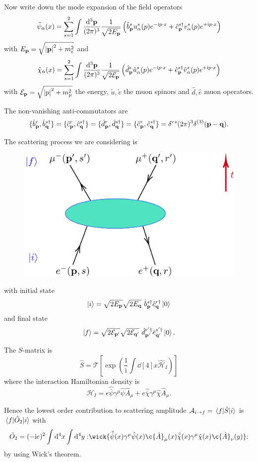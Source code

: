 \documentclass[a4paper,11pt]{article}
\begin{document}
	Now write down the mode expansion of the field operators
	\[
		\hat \psi_\alpha(x) = \sum _{s = 1}^2 \int \frac{\dd[3]{\vb p}}{(2\pi)^{3}} \frac{1}{\sqrt{2 E _{\vb p}}} \left( \hat b^s_{\vb p} u^s_\alpha(p) e ^{- \mathrm{i} p \cdot x} + \hat c^{s\dagger}_{\vb p} v^s_\alpha(p) e ^{+ \mathrm{i} p \cdot x} \right)
	\]
	with $E _{\vb p} = \sqrt{\abs{\vb p}^2 + m_e^2}$ and
	\[
		\hat \chi_\alpha(x) = \sum _{s = 1}^2 \int \frac{\dd[3]{\vb p}}{(2\pi)^{3}} \frac{1}{\sqrt{2 \mathcal{E} _{\vb p}}} \left( \hat d^s_{\vb p} \tilde u^s_\alpha(p) e ^{- \mathrm{i} p \cdot x} + \hat e^{s\dagger}_{\vb p} \tilde v^s_\alpha(p) e ^{+ \mathrm{i} p \cdot x} \right)
	\]
	with $\mathcal{E}_{\vb p} = \sqrt{\abs{p}^2 + m_\mu^2}$ the energy, $\tilde u, \tilde v$ the muon spinors and $\hat d, \hat e$ muon operators.

	The non-vanishing anti-commutators are
	\[
		\{\hat b^r _{\vb p}, \hat b ^{s\dagger}_{\vb q}\} = \{\hat c^r _{\vb p}, \hat c ^{s\dagger}_{\vb q}\} = \{\hat d^r _{\vb p}, \hat d ^{s\dagger}_{\vb q}\} = \{\hat e^r _{\vb p}, \hat e ^{s\dagger}_{\vb q}\} = \delta ^{rs} (2 \pi)^3 \delta ^{(3)}(\vb p - \vb q).
	\]
	
	The scattering process we are considering is 
	
	\begin{figure}[H]
		\centering
		\includegraphics[width=0.5\linewidth]{fig/ee-mumu.pdf}
	\end{figure}
	
	with initial state
	\[
		\ket{i} = \sqrt{2 E _{\vb p}} \sqrt{2 E _{\vb q}}\  \hat b^{s\dagger}_{\vb p} \hat c^{r\dagger}_{\vb q} \ket{0}
	\]
	and final state
	\[
		\ket{f} = \sqrt{2 \mathcal{E}_{\vb p'}} \sqrt{2 \mathcal{E}_{\vb q'}}\ \hat d^{r'\dagger}_{\vb p'} \hat e^{s'\dagger}_{\vb q'} \ket{0}.
	\]
	
	The $S$-matrix is
	\[
		\hat S = \mathcal{T}\left[ \exp(\frac{1}{\mathrm{i}} \int \dd[4]{x} \hat {\mathcal{H}}_I) \right]
	\]
	where the interaction Hamiltonian density is
	\[
		\hat{\mathcal{H}}_I = e \hat{\bar \psi} \gamma^\mu \hat \psi \hat A_\mu + e \hat{\bar \chi} \gamma^\mu \hat \chi \hat A_\mu.
	\]
	
	Hence the lowest order contribution to scattering amplitude $\mathcal{A}_{i \to f} = \mel{f}{\hat S}{i}$ is
	$\mel{f}{\hat O_2}{i}$ with
	\[
		\hat O_2 = (-\mathrm{i} e)^2 \int \dd[4]{x} \int \dd[4]{y} \nord{\wick{\hat{\bar \psi}(x) \gamma^\mu \hat \psi(x) \c{\hat A}_\mu(x) \hat{\bar \chi}(x)\gamma^\mu \hat \chi(x) \c{\hat A}_\nu(y)}}
	\]
	by using Wick's theorem. 
\end{document}
